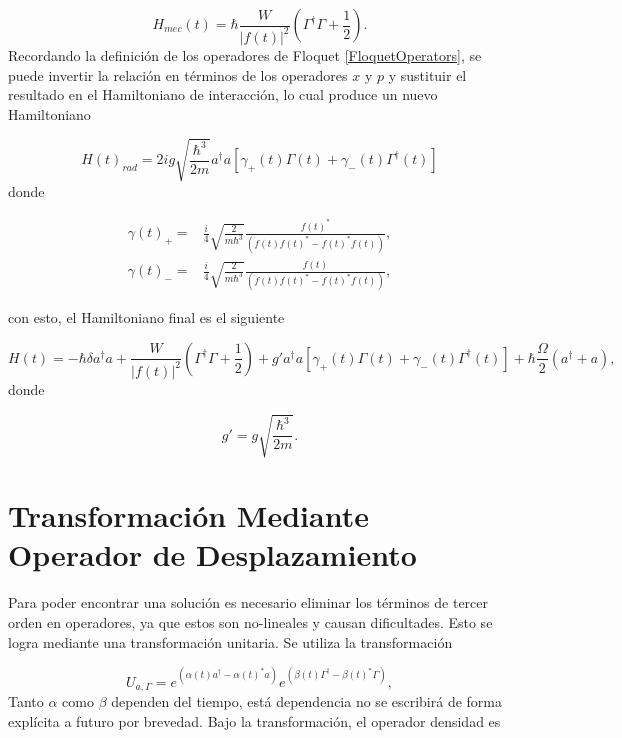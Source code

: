 \documentclass[10pt,a4paper]{report}
\begin{document}
\begin{equation}
H_{mec}(t) = \hbar\frac{W}{|f(t)|^2}(\Gamma^\dagger \Gamma + \frac{1}{2}).
\end{equation} Recordando la definición de los operadores de Floquet \eqref{FloquetOperators}, se puede invertir la relación en términos de los operadores $x$ y $p$ y sustituir el resultado en el Hamiltoniano de interacción, lo cual produce un nuevo Hamiltoniano\cite{TesisMaestria}

\begin{equation}
H(t)_{rad} = 2ig\sqrt{\frac{\hbar^3}{2m}}  a^\dagger a[\gamma_+(t)\Gamma (t) +\gamma_-(t)\Gamma^\dagger (t)]
\end{equation} donde

\begin{align}
\gamma(t)_+ =& \frac{i}{4}\sqrt{\frac{2}{m\hbar^3}} \frac{f(t)^*}{(\dot{f}(t)f(t)^*-\dot{f}(t)^*f(t))},\\
\gamma(t)_- =& \frac{i}{4}\sqrt{\frac{2}{m\hbar^3}} \frac{f(t)}{(\dot{f}(t)f(t)^*-\dot{f}(t)^*f(t))},
\end{align}

con esto, el Hamiltoniano final es el siguiente

\begin{equation}\label{LaserCoolingHamiltonian}
H(t) = -\hbar \delta a^\dagger a + \frac{W}{|f(t)|^2}(\Gamma^\dagger \Gamma + \frac{1}{2}) +  g'a^\dagger a[\gamma_+(t)\Gamma (t) +\gamma_-(t)\Gamma^\dagger (t)] + \hbar\frac{\Omega}{2}(a^\dagger + a),
\end{equation} donde 

\begin{equation}
g'=g\sqrt{\frac{\hbar^3}{2m}}.
\end{equation}

\section{Transformación Mediante Operador de Desplazamiento}

Para poder encontrar una solución es necesario eliminar los términos de tercer orden en operadores, ya que estos son no-lineales y causan dificultades. Esto se logra mediante una transformación unitaria. Se utiliza la transformación

\begin{equation}
U_{a,\Gamma} = e^{(\alpha(t) a^\dagger - \alpha(t)^*a)}e^{(\beta(t) \Gamma^\dagger - \beta(t)^*\Gamma)},
\end{equation} Tanto $\alpha$ como $\beta$ dependen del tiempo, está dependencia no se escribirá de forma explícita a futuro por brevedad. Bajo la transformación, el operador densidad es
\end{document}
